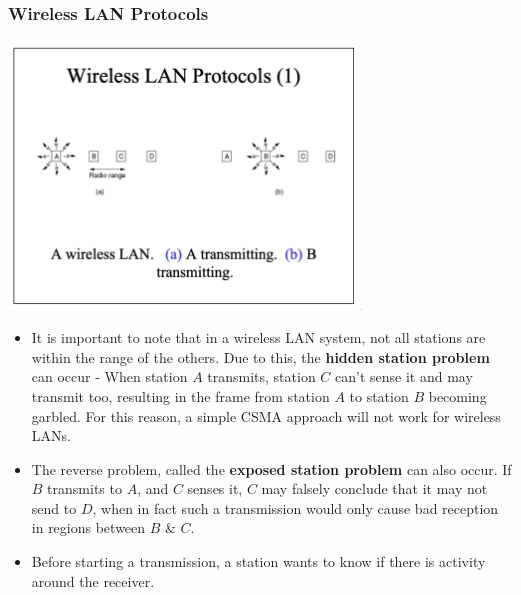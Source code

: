 \documentclass[11pt]{article}
\begin{document}
\subsubsection{Wireless LAN Protocols}
\begin{center}
    \includegraphics[width=0.7\textwidth]{wirelesslanprotocolsp14.png}
\end{center}
\begin{itemize}
    \item   It is important to note that in a wireless LAN system, not all stations are within the range of the others. 
            Due to this, the \textbf{hidden station problem} can occur - When station $A$ transmits, station $C$ can't 
            sense it and may transmit too, resulting in the frame from station $A$ to station $B$ becoming garbled. 
            For this reason, a simple CSMA approach will not work for wireless LANs.
    \item   The reverse problem, called the \textbf{exposed station problem} can also occur. 
            If $B$ transmits to $A$, and $C$ senses it, $C$ may falsely conclude that it may not send to $D$, when in fact 
            such a transmission would only cause bad reception in regions between $B$ \& $C$.
    \item   Before starting a transmission, a station wants to know if there is activity around the receiver.
\end{itemize}
\end{document}

